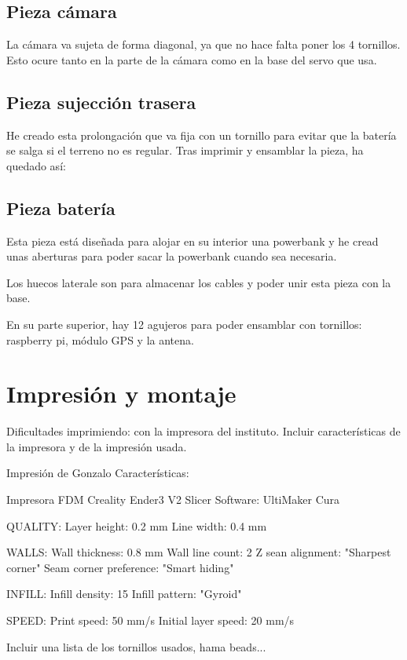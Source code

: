\subsection{Pieza cámara}
La cámara va sujeta de forma diagonal, ya que no hace falta poner los 4 tornillos. Esto ocure tanto en la parte de la cámara como en la base del servo que usa.


\subsection{Pieza sujección trasera}
He creado esta prolongación que va fija con un tornillo para evitar que la batería se salga si el terreno no es regular. Tras imprimir y ensamblar la pieza, ha quedado así:

\subsection{Pieza batería}

Esta pieza está diseñada para alojar en su interior una powerbank y he cread unas aberturas para poder sacar la powerbank cuando sea necesaria.

Los huecos laterale son para almacenar los cables y poder unir esta pieza con la base.

En su parte superior, hay 12 agujeros para poder ensamblar con tornillos: raspberry pi, módulo GPS y la antena.



\section{Impresión y montaje}


Dificultades imprimiendo: con la impresora del instituto. Incluir características de la impresora y de la impresión usada.

Impresión de Gonzalo
Características: 

Impresora FDM Creality Ender3 V2
Slicer Software: UltiMaker Cura

QUALITY:
Layer height: 0.2 mm
Line width: 0.4 mm

WALLS: 
Wall thickness: 0.8 mm
Wall line count: 2
Z sean alignment: "Sharpest corner"
Seam corner preference: "Smart hiding"

INFILL:
Infill density: 15%
Infill pattern: "Gyroid"

SPEED:
Print speed: 50 mm/s
Initial layer speed: 20 mm/s


Incluir una lista de los tornillos usados, hama  beads...\\\\



